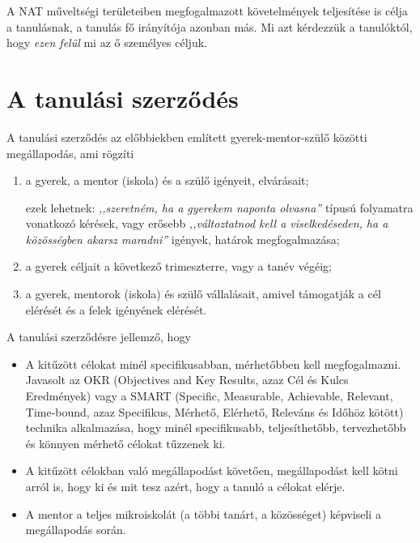 A NAT műveltségi területeiben megfogalmazott követelmények teljesítése is célja
a tanulásnak, a tanulás fő irányítója azonban más. Mi azt kérdezzük a
tanulóktól, hogy \emph{ezen felül} mi az ő személyes céljuk.

\section{A tanulási szerződés}

A tanulási szerződés az előbbiekben említett gyerek-mentor-szülő közötti
megállapodás, ami rögzíti
\begin{enumerate}
      \item a gyerek, a mentor (iskola) és a szülő igényeit, elvárásait;

            ezek lehetnek: \emph{,,szeretném, ha a gyerekem naponta olvasna''}
            típusú
            folyamatra vonatkozó kérések, vagy erősebb \emph{,,változtatnod
                  kell a
                  viselkedéseden, ha a közösségben akarsz maradni''} igények,
            határok
            megfogalmazása;

      \item a gyerek céljait a következő trimeszterre, vagy a tanév végéig;

      \item a gyerek, mentorok (iskola) és szülő vállalásait, amivel támogatják
            a
            cél
            elérését és a felek igényének elérését.

\end{enumerate}

A tanulási szerződésre jellemző, hogy
\begin{itemize}
      \item A kitűzött célokat minél specifikusabban, mérhetőbben kell
            megfogalmazni.
            Javasolt az OKR  (Objectives and Key Results, azaz	Cél és Kulcs
            Eredmények)
            \citep{okr} vagy a SMART (Specific, Measurable, Achievable,
            Relevant,
            Time-bound, azaz Specifikus,  Mérhető, Elérhető, Releváns és Időhöz
            kötött)
            \citep{wiki:smart} technika alkalmazása, hogy minél specifikusabb,
            teljesíthetőbb, tervezhetőbb és könnyen mérhető célokat tűzzenek
            ki.

      \item A kitűzött célokban való megállapodást követően, megállapodást
            kell
            kötni arról is, hogy ki és mit tesz azért, hogy a tanuló a célokat
            elérje.

      \item A mentor a teljes mikroiskolát (a többi tanárt, a közösséget)
            képviseli
            a
            megállapodás során.
\end{itemize}

